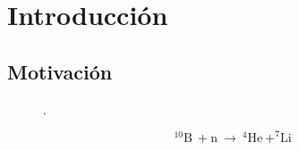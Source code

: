 \chapter{Introducci\'on}
\graphicspath{{./figs/01_intro/}}
\section{Motivación}\label{S:motivacion}


\begin{figure}[tbh!]
 \begin{center}
  \end{center}
  \caption{.}
\label{fig:}
\end{figure}


\begin{equation}
  ^{10}\text{B} \ + \text{n} \ \rightarrow \ ^{4}\text{He} \ + ^{7}\text{Li}
  \label{eq:reaccion}
\end{equation}
\noindent

